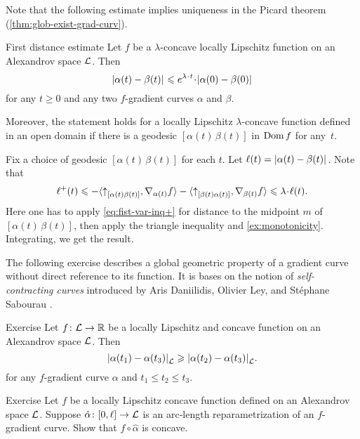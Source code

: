 Note that the following estimate implies uniqueness in the Picard theorem (\ref{thm:glob-exist-grad-curv}).

\begin{thm}{First distance estimate}\label{thm:dist-est}
Let $f$ be a $\lambda$-concave locally Lipschitz function on an Alexandrov space $\mathcal{L}$.
Then
\[\dist{\alpha(t)}{\beta(t)}{}
\le 
e^{\lambda\cdot t}\cdot\dist[{{}}]{\alpha(0)}{\beta(0)}{}\]
for any $t\ge 0$ and any two $f$-gradient curves $\alpha$ and $\beta$.

Moreover, the statement holds for a locally Lipschitz $\lambda$-concave function defined in an open domain if there is a geodesic $[\alpha(t)\,\beta(t)]$ in $\mathop{\rm Dom}\nolimits f$ for any~$t$.
\end{thm}

Fix a choice of geodesic $[\alpha(t)\,\beta(t)]$ for each $t$.
Let $\ell(t)=\dist{\alpha(t)}{\beta(t)}{}$. 
Note that
\[\ell^+(t)
\le-
\<\dir{\alpha(t)}{\beta(t)},\nabla_{\alpha(t)}f\>-\<\dir{\beta(t)}{\alpha(t)},\nabla_{\beta(t)}f\>
\le
\lambda\cdot\ell(t).\]
Here one has to apply \ref{eq:fist-var-inq+} for distance to the midpoint $m$ of $[\alpha(t)\,\beta(t)]$, then apply the triangle inequality and \ref{ex:monotonicity}.
Integrating, we get the result.
\qeds



The following exercise describes a global geometric property of a gradient curve without direct reference to its function.
It is bases on the notion of \emph{self-contracting curves} introduced by Aris Daniilidis, Olivier Ley, and St\'ephane Sabourau \cite{daniilidis-ley-sabourau}.

\begin{thm}{Exercise}\label{ex:elf-contracting}
Let $f\colon\mathcal{L}\to\mathbb{R}$ be a locally Lipschitz and concave function on an Alexandrov space
$\mathcal{L}$.
Then 
\[\dist{\alpha(t_1)}{\alpha(t_3)}{\spc{L}}\ge \dist{\alpha(t_2)}{\alpha(t_3)}{\spc{L}}.\]
for any $f$-gradient curve $\alpha$ and $t_1\le t_2\le t_3$.
\end{thm}

\begin{thm}{Exercise}\label{ex:mayer}
Let $f$ be a locally Lipschitz concave function defined on an Alexandrov space $\mathcal{L}$.
Suppose $\hat\alpha\colon[0,\ell]\to\mathcal{L}$ is an arc-length reparametrization of an $f$-gradient curve.
Show that $f\circ\hat\alpha$ is concave.
\end{thm}




